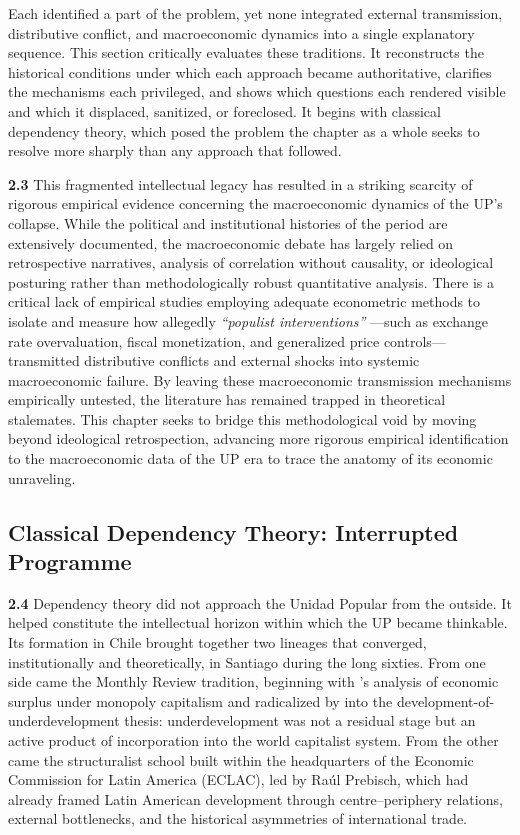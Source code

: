 Each identified a part of the problem, yet none integrated external transmission, distributive conflict, and macroeconomic dynamics into a single explanatory sequence. This section critically evaluates these traditions. It reconstructs the historical conditions under which each approach became authoritative, clarifies the mechanisms each privileged, and shows which questions each rendered visible and which it displaced, sanitized, or foreclosed. It begins with classical dependency theory, which posed the problem the chapter as a whole seeks to resolve more sharply than any approach that followed. 

\textbf{2.3} This fragmented intellectual legacy has resulted in a striking scarcity of rigorous empirical evidence concerning the macroeconomic dynamics of the UP's collapse. While the political and institutional histories of the period are extensively documented, the macroeconomic debate has largely relied on retrospective narratives, analysis of correlation without causality, or ideological posturing rather than methodologically robust quantitative analysis. There is a critical lack of empirical studies employing adequate econometric methods to isolate and measure how allegedly \textit{``populist interventions''} ---such as exchange rate overvaluation, fiscal monetization, and generalized price controls---transmitted distributive conflicts and external shocks into systemic macroeconomic failure. By leaving these macroeconomic transmission mechanisms empirically untested, the literature has remained trapped in theoretical stalemates. This chapter seeks to bridge this methodological void by moving beyond ideological retrospection, advancing more rigorous empirical identification to the macroeconomic data of the UP era to trace the anatomy of its economic unraveling.

\subsection{Classical Dependency Theory: Interrupted Programme}
\label{sec:A1_classical_deptheory}

\textbf{2.4} Dependency theory did not approach the Unidad Popular from the outside. It helped constitute the intellectual horizon within which the UP became thinkable. Its formation in Chile brought together two lineages that converged, institutionally and theoretically, in Santiago during the long sixties. From one side came the Monthly Review tradition, beginning with \citet{Baran1957}'s analysis of economic surplus under monopoly capitalism and radicalized by \citet{Frank1967} into the development-of-underdevelopment thesis: underdevelopment was not a residual stage but an active product of incorporation into the world capitalist system. From the other came the structuralist school built within the headquarters of the Economic Commission for Latin America (ECLAC), led by Raúl Prebisch, which had already framed Latin American development through centre--periphery relations, external bottlenecks, and the historical asymmetries of international trade.

